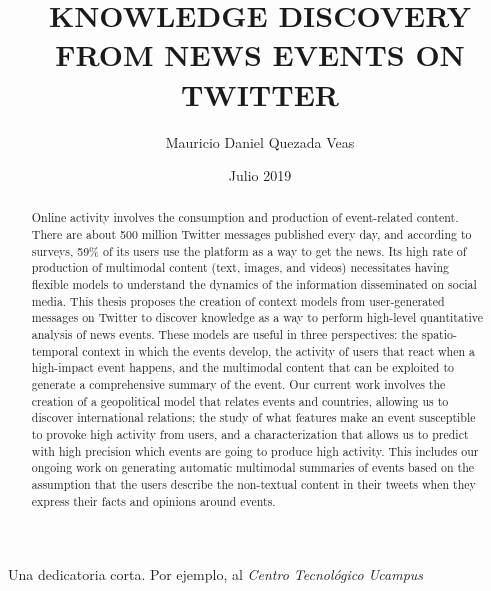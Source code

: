 \documentclass[upright, contnum]{umemoria}
\author{Mauricio Daniel Quezada Veas}
\title{KNOWLEDGE DISCOVERY FROM NEWS EVENTS ON TWITTER}
\date{Julio 2019}
\begin{document}
\frontmatter
\maketitle 

\begin{abstract} 

    Online activity involves the consumption and production of event-related
    content. 
    There are about 500 million Twitter messages published every day, and
    according to surveys, 59\% of its users use the platform as a way to get the
    news. 
    Its high rate of production of multimodal content (text, images, and videos)
    necessitates having flexible models to understand the dynamics of
    the information disseminated on social media. 
    This thesis proposes the creation of context models from user-generated
    messages on Twitter to discover knowledge as a way to perform high-level
    quantitative analysis of news events. 
    These models are useful in three perspectives: the
    spatio-temporal context in which the events develop, the activity of users
    that react when a high-impact event happens, and the multimodal content that
    can be exploited to generate a comprehensive summary of the event. 
    Our current work involves the creation of a geopolitical model that relates
    events and countries, allowing us to discover international relations; 
    the study of what features make an event susceptible to provoke high
    activity from users, and a characterization that allows us to predict with
    high precision which events are going to produce high activity. 
    This includes our ongoing work on generating automatic multimodal summaries
    of events based on the assumption that the users describe the non-textual
    content in their tweets when they express their facts and opinions around
    events.
\end{abstract}

\begin{dedicatoria} %
Una dedicatoria corta. Por ejemplo, al \emph{Centro Tecnológico Ucampus}
\end{dedicatoria}

\begin{thanks} %
\lipsum[1-2]
\end{thanks}
\cleardoublepage

\tableofcontents
\listoftables %
\listoffigures %

\mainmatter















\listoftodos[Notes]  %
\end{document}
